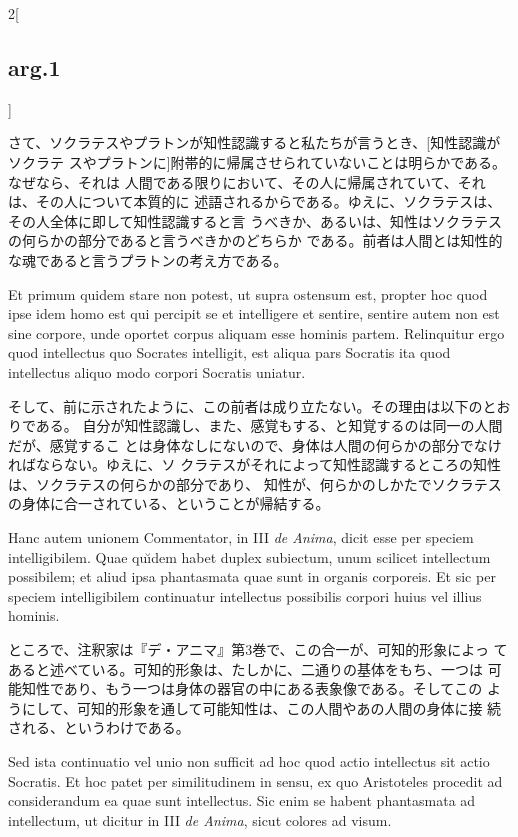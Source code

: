 \documentclass[paper=a4paper,fontsize=10pt,jafontsize=9pt,titlepage]{jlreq}
\begin{document}
\begin{paracol}{2}[\subsection{arg.1}]
\switchcolumn

 さて、ソクラテスやプラトンが知性認識すると私たちが言うとき、[知性認識がソクラテ
 スやプラトンに]附帯的に帰属させられていないことは明らかである。なぜなら、それは
 人間である限りにおいて、その人に帰属されていて、それは、その人について本質的に
 述語されるからである。ゆえに、ソクラテスは、その人全体に即して知性認識すると言
 うべきか、あるいは、知性はソクラテスの何らかの部分であると言うべきかのどちらか
 である。前者は人間とは知性的な魂であると言うプラトンの考え方である。
 
\switchcolumn*

 Et primum quidem stare non potest, ut supra ostensum est, propter hoc
 quod ipse idem homo est qui percipit se et intelligere et sentire,
 sentire autem non est sine corpore, unde oportet corpus aliquam esse
 hominis partem. Relinquitur ergo quod intellectus quo Socrates
 intelligit, est aliqua pars Socratis ita quod intellectus aliquo modo
 corpori Socratis uniatur.
 
\switchcolumn

そして、前に示されたように、この前者は成り立たない。その理由は以下のとおりである。
自分が知性認識し、また、感覚もする、と知覚するのは同一の人間だが、感覚するこ
とは身体なしにないので、身体は人間の何らかの部分でなければならない。ゆえに、ソ
クラテスがそれによって知性認識するところの知性は、ソクラテスの何らかの部分であり、
知性が、何らかのしかたでソクラテスの身体に合一されている、ということが帰結する。

 
\switchcolumn*



Hanc autem unionem Commentator, in III {\itshape de Anima}, dicit esse
per speciem intelligibilem. Quae qu\u{\i}dem habet duplex subiectum, unum
scilicet intellectum possibilem; et aliud ipsa phantasmata quae sunt
in organis corporeis. Et sic per speciem intelligibilem continuatur
intellectus possibilis corpori huius vel illius hominis.
 
\switchcolumn

ところで、注釈家は『デ・アニマ』第3巻で、この合一が、可知的形象によっ
てあると述べている。可知的形象は、たしかに、二通りの基体をもち、一つは
可能知性であり、もう一つは身体の器官の中にある表象像である。そしてこの
ようにして、可知的形象を通して可能知性は、この人間やあの人間の身体に接
続される、というわけである。
 
\switchcolumn*

 Sed ista continuatio vel unio non sufficit ad hoc quod actio
 intellectus sit actio Socratis. Et hoc patet per similitudinem in
 sensu, ex quo Aristoteles procedit ad considerandum ea quae sunt
 intellectus. Sic enim se habent phantasmata ad intellectum, ut
 dicitur in III {\itshape de Anima}, sicut colores ad visum.
 

\end{paracol}
\end{document}
